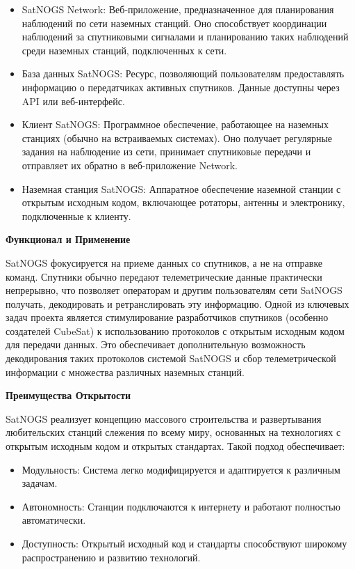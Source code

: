 \documentclass[12pt, a4paper]{extreport}
\begin{document}
\begin{itemize}[label=\textbullet]
	\item	SatNOGS Network: Веб-приложение, предназначенное для планирования наблюдений по сети наземных станций. Оно способствует координации наблюдений за спутниковыми сигналами и планированию таких наблюдений среди наземных станций, подключенных к сети.
	\item	База данных SatNOGS: Ресурс, позволяющий пользователям предоставлять информацию о передатчиках активных спутников. Данные доступны через API или веб-интерфейс.
	\item	Клиент SatNOGS: Программное обеспечение, работающее на наземных станциях (обычно на встраиваемых системах). Оно получает регулярные задания на наблюдение из сети, принимает спутниковые передачи и отправляет их обратно в веб-приложение Network.
	\item	Наземная станция SatNOGS: Аппаратное обеспечение наземной станции с открытым исходным кодом, включающее ротаторы, антенны и электронику, подключенные к клиенту.
\end{itemize}

\textbf{Функционал и Применение}

SatNOGS фокусируется на приеме данных со спутников, а не на отправке команд. Спутники обычно передают телеметрические данные практически непрерывно, что позволяет операторам и другим пользователям сети SatNOGS получать, декодировать и ретранслировать эту информацию.
Одной из ключевых задач проекта является стимулирование разработчиков спутников (особенно создателей CubeSat) к использованию протоколов с открытым исходным кодом для передачи данных. Это обеспечивает дополнительную возможность декодирования таких протоколов системой SatNOGS и сбор телеметрической информации с множества различных наземных станций.

\textbf{Преимущества Открытости}

SatNOGS реализует концепцию массового строительства и развертывания любительских станций слежения по всему миру, основанных на технологиях с открытым исходным кодом и открытых стандартах. Такой подход обеспечивает:

\begin{itemize}[label=\textbullet]
	\item	Модульность: Система легко модифицируется и адаптируется к различным задачам.
	\item	Автономность: Станции подключаются к интернету и работают полностью автоматически.
	\item	Доступность: Открытый исходный код и стандарты способствуют широкому распространению и развитию технологий.
\end{itemize}
\end{document}
